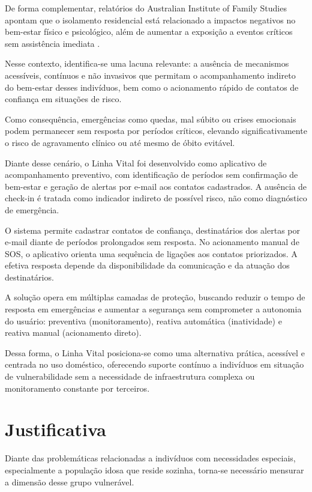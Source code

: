De forma complementar, relatórios do Australian Institute of Family Studies apontam que o isolamento residencial está relacionado a impactos negativos no bem-estar físico e psicológico, além de aumentar a exposição a eventos críticos sem assistência imediata \cite{aifs2014}.

Nesse contexto, identifica-se uma lacuna relevante: a ausência de mecanismos acessíveis, contínuos e não invasivos que permitam o acompanhamento indireto do bem-estar desses indivíduos, bem como o acionamento rápido de contatos de confiança em situações de risco.

Como consequência, emergências como quedas, mal súbito ou crises emocionais podem permanecer sem resposta por períodos críticos, elevando significativamente o risco de agravamento clínico ou até mesmo de óbito evitável.

Diante desse cenário, o Linha Vital foi desenvolvido como aplicativo de acompanhamento preventivo, com identificação de períodos sem confirmação de bem-estar e geração de alertas por e-mail aos contatos cadastrados. A ausência de check-in é tratada como indicador indireto de possível risco, não como diagnóstico de emergência.

O sistema permite cadastrar contatos de confiança, destinatários dos alertas por e-mail diante de períodos prolongados sem resposta. No acionamento manual de SOS, o aplicativo orienta uma sequência de ligações aos contatos priorizados. A efetiva resposta depende da disponibilidade da comunicação e da atuação dos destinatários.

A solução opera em múltiplas camadas de proteção, buscando reduzir o tempo de resposta em emergências e aumentar a segurança sem comprometer a autonomia do usuário: preventiva (monitoramento), reativa automática (inatividade) e reativa manual (acionamento direto).

Dessa forma, o Linha Vital posiciona-se como uma alternativa prática, acessível e centrada no uso doméstico, oferecendo suporte contínuo a indivíduos em situação de vulnerabilidade sem a necessidade de infraestrutura complexa ou monitoramento constante por terceiros.

\section{Justificativa}

Diante das problemáticas relacionadas a indivíduos com necessidades especiais, especialmente a população idosa que reside sozinha, torna-se necessário mensurar a dimensão desse grupo vulnerável.

